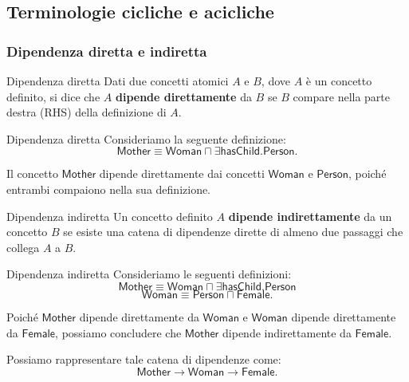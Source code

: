 \newpage

\subsection{Terminologie cicliche e acicliche}

\subsubsection{Dipendenza diretta e indiretta}

\begin{definition}{Dipendenza diretta}
    Dati due concetti atomici $A$ e $B$, dove $A$ è un
    concetto definito, si dice che $A$ \textbf{dipende
    direttamente} da $B$ se $B$ compare nella parte destra
    (RHS) della definizione di $A$.
\end{definition}

\begin{example}{Dipendenza diretta}
    Consideriamo la seguente definizione:
    \[
        \mathsf{Mother} \equiv
        \mathsf{Woman} \sqcap
        \exists\mathsf{hasChild}.\mathsf{Person}.
    \]

    Il concetto $\mathsf{Mother}$ dipende direttamente
    dai concetti $\mathsf{Woman}$ e $\mathsf{Person}$,
    poiché entrambi compaiono nella sua definizione.
\end{example}

\begin{definition}{Dipendenza indiretta}
    Un concetto definito $A$ \textbf{dipende indirettamente}
    da un concetto $B$ se esiste una catena di dipendenze
    dirette di almeno due passaggi che collega $A$ a $B$.
\end{definition}

\begin{example}{Dipendenza indiretta}
    Consideriamo le seguenti definizioni:
    \[
        \mathsf{Mother} \equiv
        \mathsf{Woman} \sqcap
        \exists\mathsf{hasChild}.\mathsf{Person}
    \]
    \[
        \mathsf{Woman} \equiv
        \mathsf{Person} \sqcap \mathsf{Female}.
    \]

    Poiché $\mathsf{Mother}$ dipende direttamente da
    $\mathsf{Woman}$ e $\mathsf{Woman}$ dipende direttamente
    da $\mathsf{Female}$, possiamo concludere che
    $\mathsf{Mother}$ dipende indirettamente da
    $\mathsf{Female}$.

    Possiamo rappresentare tale catena di dipendenze come:
    \[
        \mathsf{Mother}
        \longrightarrow
        \mathsf{Woman}
        \longrightarrow
        \mathsf{Female}.
    \]
\end{example}

